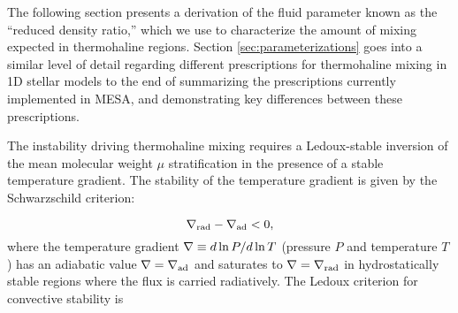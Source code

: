 
The following section presents a derivation of the fluid parameter known as the ``reduced density ratio,'' which we use to characterize the amount of mixing expected in thermohaline regions.  
Section \ref{sec:parameterizations} goes into a similar level of detail regarding different prescriptions for thermohaline mixing in 1D stellar models 
to the end of summarizing the prescriptions currently implemented in MESA, and demonstrating key differences between these prescriptions.


%
The instability driving thermohaline mixing requires a Ledoux-stable inversion of the mean molecular weight $\mu$ stratification in the presence of a stable temperature gradient. 
The stability of the temperature gradient is given by the Schwarzschild criterion:

\begin{equation} \label{eq:Schwarzschild}
    \gradrad - \gradad < 0,
\end{equation}
where the temperature gradient $\nabla \equiv d \ln P / d \ln T$ (pressure $P$ and temperature $T$) has an adiabatic value $\nabla = \nabla_{\rm{ad}}$ and saturates to $\nabla = \nabla_{\rm{rad}}$ in hydrostatically stable regions where the flux is carried radiatively. 
The Ledoux criterion for convective stability is \citep{Ledoux1947}

